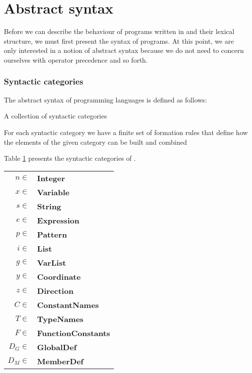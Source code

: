\section{Abstract syntax}
\label{sec:abstractsyntax}
Before we can describe the behaviour of programs written in \productname{} and
their lexical structure, we must first present the syntax of programs. At this
point, we are only interested in a notion of abstract syntax because we do not
need to concern ourselves with operator precedence and so forth.

\subsubsection{Syntactic categories}
The abstract syntax of programming languages is defined as follows\cite[p.
27]{tt-hh}:

\begin{dlist}
  \item A collection of syntactic categories
  \item For each syntactic category we have a finite set of formation rules
    that define how the elements of the given category can be built and combined
\end{dlist}

Table \ref{table:syn-cat} presents the syntactic categories of \productname{}.

\begin{table}[ht]
  \begin{center}
    \begin{tabular}{rl}
      \hline
      $n \in$ & \textbf{Integer}         \\
      $x \in$ & \textbf{Variable}        \\
      $s \in$ & \textbf{String}          \\
      $e \in$ & \textbf{Expression}      \\
      $p \in$ & \textbf{Pattern}         \\
      $i \in$ & \textbf{List}            \\
      $g \in$ & \textbf{VarList}         \\
      $y \in$ & \textbf{Coordinate}      \\
      $z \in$ & \textbf{Direction}       \\
      $C \in$ & \textbf{ConstantNames}   \\
      $T \in$ & \textbf{TypeNames}       \\
      $F \in$ & \textbf{FunctionConstants} \\
      $D_{G} \in$ & \textbf{GlobalDef}   \\
      $D_{M} \in$ & \textbf{MemberDef}   \\
      \hline
    \end{tabular}  
    \label{table:syn-cat}
  \end{center}
\end{table}

